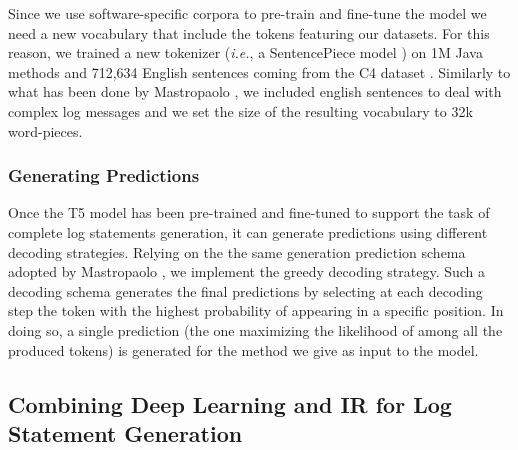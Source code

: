 Since we use software-specific corpora to pre-train and fine-tune the model we need a new vocabulary that include the \java tokens featuring our datasets. For this reason, we trained a new tokenizer (\emph{i.e.}, a SentencePiece model \cite{kudo2018sentencepiece}) on 1M Java methods and 712,634 English sentences coming from the C4 dataset \cite{raffel2019exploring}. Similarly to what has been done by Mastropaolo \etal \cite{mastropaolo2022using}, we included english sentences to deal with complex log messages and we set the size of the resulting vocabulary to 32k word-pieces.


\subsubsection{Generating Predictions}
Once the T5 model has been pre-trained and fine-tuned to support the task of complete log statements generation, it can generate predictions using different decoding strategies. Relying on the the same generation prediction schema adopted by Mastropaolo \etal \cite{mastropaolo2022using}, we implement the greedy decoding strategy. Such a decoding schema generates the final predictions by selecting at each decoding step the token with the highest probability of appearing in a specific position. In doing so, a single prediction (\ie the one maximizing the likelihood of among all the produced tokens) is generated for the method we give as input to the model.

%
%
%
%


\subsection{Combining Deep Learning and IR for Log Statement Generation}

